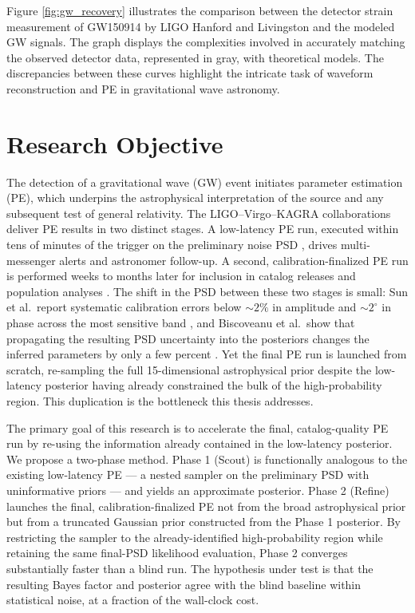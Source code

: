 \documentclass[12pt]{article}
\begin{document}
Figure \ref{fig:gw_recovery} illustrates the comparison between the detector strain measurement of GW150914 by LIGO Hanford and Livingston and the modeled GW signals. The graph displays the complexities involved in accurately matching the observed detector data, represented in gray, with theoretical models. The discrepancies between these curves highlight the intricate task of waveform reconstruction and PE in gravitational wave astronomy.


\section{Research Objective}
The detection of a gravitational wave (GW) event initiates parameter estimation (PE), which underpins the astrophysical interpretation of the source and any subsequent test of general relativity. The LIGO--Virgo--KAGRA collaborations deliver PE results in two distinct stages. A low-latency PE run, executed within tens of minutes of the trigger on the preliminary noise PSD \cite{Chaudhary2024, Bilby: A user-friendly}, drives multi-messenger alerts and astronomer follow-up. A second, calibration-finalized PE run is performed weeks to months later for inclusion in catalog releases and population analyses \cite{GWTC3}. The shift in the PSD between these two stages is small: Sun et al.\ report systematic calibration errors below $\sim 2\%$ in amplitude and $\sim 2^\circ$ in phase across the most sensitive band \cite{Sun2020}, and Biscoveanu et al.\ show that propagating the resulting PSD uncertainty into the posteriors changes the inferred parameters by only a few percent \cite{Biscoveanu2020}. Yet the final PE run is launched from scratch, re-sampling the full 15-dimensional astrophysical prior despite the low-latency posterior having already constrained the bulk of the high-probability region. This duplication is the bottleneck this thesis addresses.

The primary goal of this research is to accelerate the final, catalog-quality PE run by re-using the information already contained in the low-latency posterior. We propose a two-phase method. Phase 1 (Scout) is functionally analogous to the existing low-latency PE — a nested sampler on the preliminary PSD with uninformative priors — and yields an approximate posterior. Phase 2 (Refine) launches the final, calibration-finalized PE not from the broad astrophysical prior but from a truncated Gaussian prior constructed from the Phase 1 posterior. By restricting the sampler to the already-identified high-probability region while retaining the same final-PSD likelihood evaluation, Phase 2 converges substantially faster than a blind run. The hypothesis under test is that the resulting Bayes factor and posterior agree with the blind baseline within statistical noise, at a fraction of the wall-clock cost.
\end{document}

